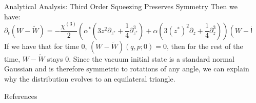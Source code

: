 \documentclass[final]{beamer}
\newlength{\sepwidth}
\newlength{\colwidth}
\newcommand{\separatorcolumn}{\begin{column}{\sepwidth}\end{column}}
\begin{document}
\begin{frame}[t]
\begin{columns}[t]
\begin{column}{\colwidth}
\begin{block}{Analytical Analysis: Third Order Squeezing Preserves Symmetry}
        Then we have:
        \[\partial_{t}(W-\tilde{W})=-\frac{\chi^{(3)}}{2}\left(\alpha^{*}\left(3z^{2}\partial_{z^{*}}+\frac{1}{4}\partial_{z^{*}}^{3}\right)+\alpha\left(3(z^{*})^{2}\partial_{z}+\frac{1}{4}\partial_{z}^{3}\right)\right)(W-\tilde{W})\]
        If we have that for time $0$, $(W-\tilde{W})(q,p;0)=0$, then for the rest of the time, $W-\tilde{W}$ stays $0$.
        Since the vacuum initial state is a standard normal Gaussian and is therefore symmetric to rotations of any angle, we can explain why the distribution evolves to an equilateral triangle.
      \end{block}

      \begin{block}{References}
        \nocite{*}
        \footnotesize{}
      \end{block}
    \end{column}

    \separatorcolumn
  \end{columns}
\end{frame}
\end{document}
